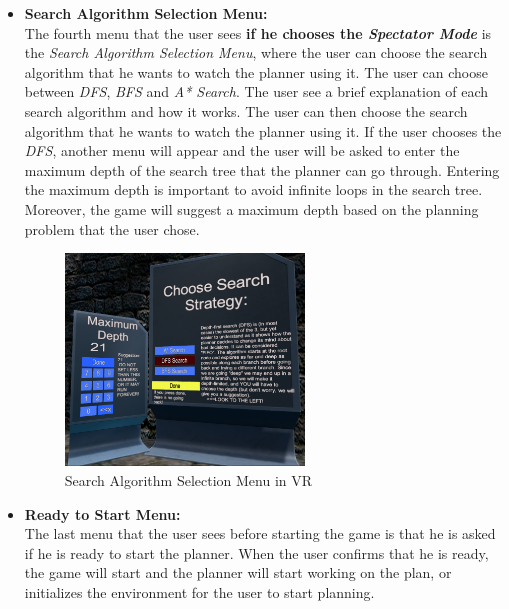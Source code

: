 \begin{itemize}
    \item \textbf{Search Algorithm Selection Menu:} \\
          The fourth menu that the user sees \textbf{if he chooses the \textit{Spectator Mode}} is the \textit{Search Algorithm Selection Menu}, where the user can choose the search algorithm that he wants to watch the planner using it. The user can choose between \textit{\ac{DFS}}, \textit{\ac{BFS}} and \textit{\ac{A*} Search}. The user see a brief explanation of each search algorithm and how it works. The user can then choose the search algorithm that he wants to watch the planner using it. If the user chooses the \textit{\ac{DFS}}, another menu will appear and the user will be asked to enter the maximum depth of the search tree that the planner can go through. Entering the maximum depth is important to avoid infinite loops in the search tree. Moreover, the game will suggest a maximum depth based on the planning problem that the user chose.

          \begin{figure}[H]
              \centering
              \includegraphics[width=0.6\textwidth]{images/search_strategy.png}
              \caption[Search Algorithm Selection Menu in VR]{Search Algorithm Selection Menu in VR}
              \label{fig:vr_search_algorithm_menu}
          \end{figure}

    \item \textbf{Ready to Start Menu:} \\
          The last menu that the user sees before starting the game is that he is asked if he is ready to start the planner. When the user confirms that he is ready, the game will start and the planner will start working on the plan, or initializes the environment for the user to start planning.

\end{itemize}

